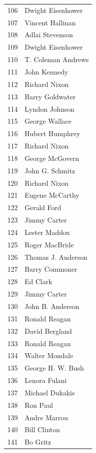 \documentclass[
  letterpaper,
  DIV=11,
  numbers=noendperiod]{scrreprt}
\begin{document}
\begin{tabular}{ll}
106 &       Dwight Eisenhower \\
107 &        Vincent Hallinan \\
108 &         Adlai Stevenson \\
109 &       Dwight Eisenhower \\
110 &      T. Coleman Andrews \\
111 &            John Kennedy \\
112 &           Richard Nixon \\
113 &         Barry Goldwater \\
114 &          Lyndon Johnson \\
115 &          George Wallace \\
116 &         Hubert Humphrey \\
117 &           Richard Nixon \\
118 &         George McGovern \\
119 &         John G. Schmitz \\
120 &           Richard Nixon \\
121 &         Eugene McCarthy \\
122 &             Gerald Ford \\
123 &            Jimmy Carter \\
124 &           Lester Maddox \\
125 &          Roger MacBride \\
126 &      Thomas J. Anderson \\
127 &          Barry Commoner \\
128 &                Ed Clark \\
129 &            Jimmy Carter \\
130 &        John B. Anderson \\
131 &           Ronald Reagan \\
132 &          David Bergland \\
133 &           Ronald Reagan \\
134 &          Walter Mondale \\
135 &       George H. W. Bush \\
136 &           Lenora Fulani \\
137 &         Michael Dukakis \\
138 &                Ron Paul \\
139 &            Andre Marrou \\
140 &            Bill Clinton \\
141 &                Bo Gritz \\

\end{tabular}
\end{document}
